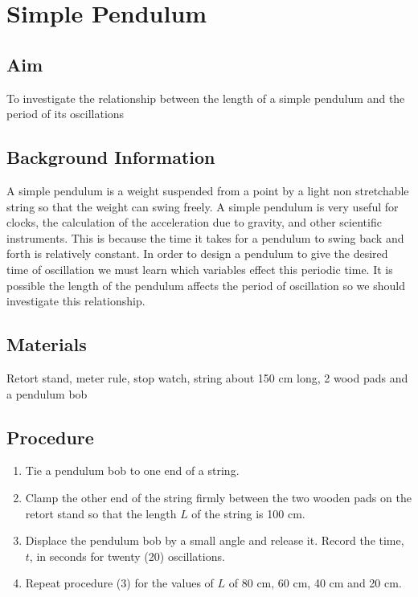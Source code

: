 \chapter{Simple Pendulum}

\section{Aim}
To investigate the relationship between the length of a simple pendulum and the period of its oscillations

\section{Background Information}
A simple pendulum is a weight suspended from a point by a light non stretchable string so that the weight can swing freely. A simple pendulum is very useful for clocks, the calculation of the acceleration due to gravity, and other scientific instruments. This is because the time it takes for a pendulum to swing back and forth is relatively constant. In order to design a pendulum to give the desired time of oscillation we must learn which variables effect this periodic time. It is possible the length of the pendulum affects the period of oscillation so we should investigate this relationship. 

\section{Materials}
Retort stand, meter rule, stop watch, string about 150 cm long, 2 wood pads and a pendulum bob

\section{Procedure}
\begin{enumerate}
\item Tie a pendulum bob to one end of a string.
\item Clamp the other end of the string firmly between the two wooden pads on the retort stand so that the length $L$ of the string is 100 cm.
\item Displace the pendulum bob by a small angle and release it. Record the time, $t$, in seconds for twenty (20) oscillations.  
\item Repeat procedure (3) for the values of $L$ of 80 cm, 60 cm, 40 cm and 20 cm.
\end{enumerate}


